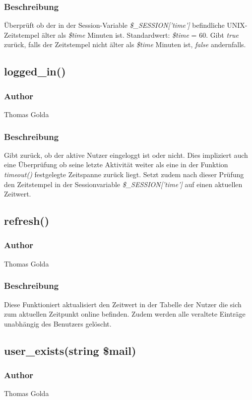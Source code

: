 \documentclass[fontsize = 12pt, paper = a4]{scrreprt}
\begin{document}
\subsubsection*{Beschreibung}
Überprüft ob der in der Session-Variable \textit{\$\_SESSION['time']} befindliche UNIX-Zeitstempel älter als \textit{\$time} Minuten ist. Standardwert: \textit{\$time} = 60.
Gibt \textit{true} zurück, falls der Zeitstempel nicht älter als \textit{\$time} Minuten ist, \textit{false} andernfalls.


\subsection*{logged\_in()}
\subsubsection*{Author}
Thomas Golda
\subsubsection*{Beschreibung}
Gibt zurück, ob der aktive Nutzer eingeloggt ist oder nicht. Dies impliziert auch eine Überprüfung ob seine letzte Aktivität weiter als eine in der Funktion \textit{timeout()} festgelegte Zeitspanne zurück liegt.
Setzt zudem nach dieser Prüfung den Zeitstempel in der Sessionvariable \textit{\$\_SESSION['time']} auf einen aktuellen Zeitwert.

\subsection*{refresh()}
\subsubsection*{Author}
Thomas Golda
\subsubsection*{Beschreibung}
Diese Funktioniert aktualisiert den Zeitwert in der Tabelle der Nutzer die sich zum aktuellen Zeitpunkt online befinden. Zudem werden alle veraltete Einträge unabhängig des Benutzers gelöscht.


\subsection*{user\_exists(string \$mail)}
\subsubsection*{Author}
Thomas Golda
\end{document}
